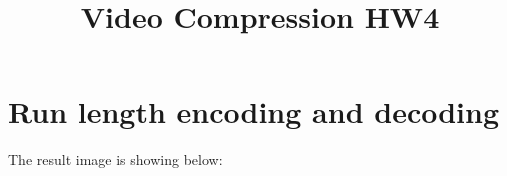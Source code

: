 \documentclass{homework}
\begin{document}
\title{Video Compression HW4}
\author{\chineseName \masterStudentID}
\date{}
\maketitle


\section*{Run length encoding and decoding}

The result image is showing below:
\end{document}
